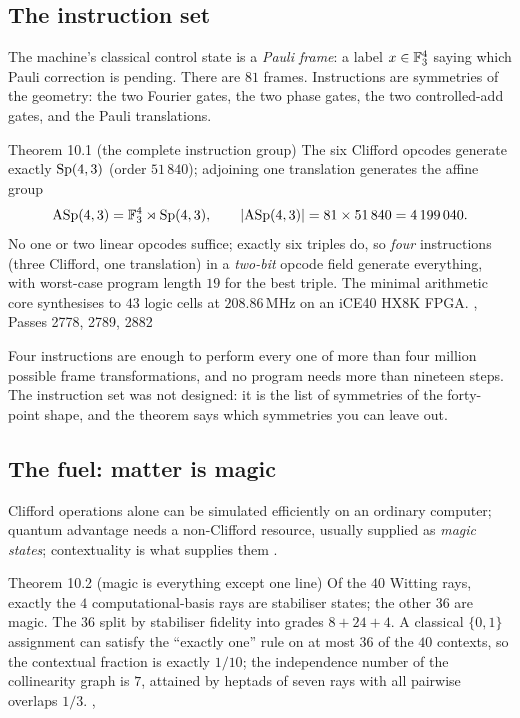\subsection{The instruction set}

The machine's classical control state is a \emph{Pauli frame}: a label $x\in\mathbb{F}_3^4$ saying
which Pauli correction is pending. There are $81$ frames. Instructions are symmetries of
the geometry: the two Fourier gates, the two phase gates, the two controlled-add gates, and
the Pauli translations.

\begin{result}{Theorem 10.1 (the complete instruction group) \hfill \tierC}
The six Clifford opcodes generate exactly $\mathrm{Sp}(4,3)$ (order $51\,840$); adjoining one
translation generates the affine group
\[
\mathrm{ASp}(4,3)=\mathbb{F}_3^4\rtimes\mathrm{Sp}(4,3),\qquad |\mathrm{ASp}(4,3)|=81\times51\,840=4\,199\,040 .
\]
No one or two linear opcodes suffice; exactly six triples do, so \emph{four} instructions
(three Clifford, one translation) in a \emph{two-bit} opcode field generate everything, with
worst-case program length $19$ for the best triple. The minimal arithmetic core synthesises
to $43$ logic cells at $208.86$\,MHz on an iCE40 HX8K FPGA.
, Passes 2778, 2789, 2882
\end{result}

\begin{plainwords}
Four instructions are enough to perform every one of more than four million possible
frame transformations, and no program needs more than nineteen steps. The instruction set
was not designed: it is the list of symmetries of the forty-point shape, and the
theorem says which symmetries you can leave out.
\end{plainwords}

\subsection{The fuel: matter is magic}

Clifford operations alone can be simulated efficiently on an ordinary computer; quantum
advantage needs a non-Clifford resource, usually supplied as \emph{magic states}; contextuality is what
supplies them \cite{Howard2014}.

\begin{result}{Theorem 10.2 (magic is everything except one line) \hfill \tierC}
Of the $40$ Witting rays, exactly the $4$ computational-basis rays are stabiliser states;
the other $36$ are magic. The $36$ split by stabiliser fidelity into grades $8+24+4$. A
classical $\{0,1\}$ assignment can satisfy the ``exactly one'' rule on at most $36$ of the
$40$ contexts, so the contextual fraction is exactly $1/10$; the independence number of the
collinearity graph is $7$, attained by heptads of seven rays with all pairwise overlaps $1/3$.
, 
\end{result}

